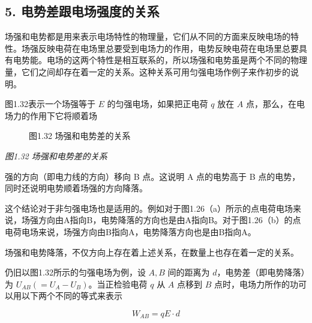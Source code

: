 \subsection{5.
电势差跟电场强度的关系}\label{ux7535ux52bfux5deeux8ddfux7535ux573aux5f3aux5ea6ux7684ux5173ux7cfb}

场强和电势都是用来表示电场特性的物理量，它们从不同的方面来反映电场的特性。场强反映电荷在电场里总要受到电场力的作用，电势反映电荷在电场里总要具有电势能。电场的这两个特性是相互联系的，所以场强和电势虽是两个不同的物理量，它们之间却存在着一定的关系。这种关系可用匀强电场作例子来作初步的说明。

图1.32表示一个场强等于 \(E\) 的匀强电场，如果把正电荷 \(q\) 放在 \(A\)
点，那么，在电场力的作用下它将顺着场

\begin{figure}
\centering
{}
\caption{图1.32 场强和电势差的关系}
\end{figure}

\emph{图1.32 场强和电势差的关系}

强的方向（即电力线的方向）移向 B 点。这说明 A 点的电势高于 B 点的电势，
同时还说明电势顺着场强的方向降落。

这个结论对于非匀强电场也是适用的。例如对于图1.26（a）所示的点电荷电场来说，场强方向由A指向B，电势降落的方向也是由A指向B。对于图1.26（b）的点电荷电场来说，场强方向由B指向A，电势降落方向也是由B指向A。

场强和电势降落，不仅方向上存在着上述关系，在数量上也存在着一定的关系。

仍旧以图1.32所示的匀强电场为例，设 \(A, B\) 间的距离为
\(d\)，电势差（即电势降落）为 \(U_{AB}(=U_A-U_B)\)。当正检验电荷 \(q\)
从 \(A\) 点移到 \(B\) 点时，电场力所作的功可以用以下两个不同的等式来表示

\[
W_{A B} = q E \cdot d
\]

